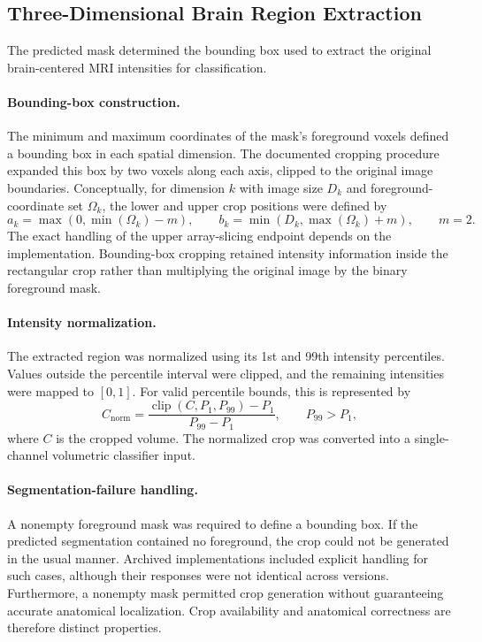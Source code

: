 \subsection{Three-Dimensional Brain Region Extraction}
\label{subsec:3d_roi_extraction}

The predicted mask determined the bounding box used to extract the original brain-centered MRI intensities for classification.

\paragraph{Bounding-box construction.}
The minimum and maximum coordinates of the mask's foreground voxels defined a bounding box in each spatial dimension. The documented cropping procedure expanded this box by two voxels along each axis, clipped to the original image boundaries. Conceptually, for dimension $k$ with image size $D_k$ and foreground-coordinate set $\Omega_k$, the lower and upper crop positions were defined by
\begin{equation}
a_k=\max(0,\min(\Omega_k)-m),\qquad
b_k=\min(D_k,\max(\Omega_k)+m),\qquad m=2.
\end{equation}
The exact handling of the upper array-slicing endpoint depends on the implementation. Bounding-box cropping retained intensity information inside the rectangular crop rather than multiplying the original image by the binary foreground mask.

\paragraph{Intensity normalization.}
The extracted region was normalized using its 1st and 99th intensity percentiles. Values outside the percentile interval were clipped, and the remaining intensities were mapped to $[0,1]$. For valid percentile bounds, this is represented by
\begin{equation}
C_{\mathrm{norm}}=
\frac{\operatorname{clip}(C,P_1,P_{99})-P_1}
{P_{99}-P_1},\qquad P_{99}>P_1,
\end{equation}
where $C$ is the cropped volume. The normalized crop was converted into a single-channel volumetric classifier input.

\paragraph{Segmentation-failure handling.}
A nonempty foreground mask was required to define a bounding box. If the predicted segmentation contained no foreground, the crop could not be generated in the usual manner. Archived implementations included explicit handling for such cases, although their responses were not identical across versions. Furthermore, a nonempty mask permitted crop generation without guaranteeing accurate anatomical localization. Crop availability and anatomical correctness are therefore distinct properties.

